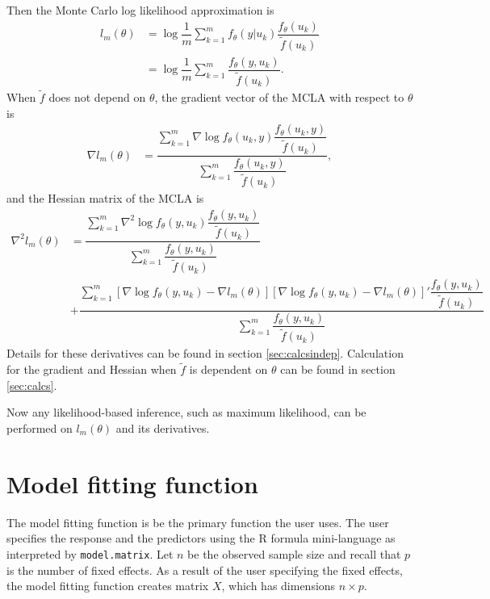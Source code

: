 \documentclass{article}
\begin{document}
Then the Monte Carlo log likelihood approximation is
\begin{align}
l_{m}(\theta) &=\log \dfrac{1}{m} \sum_{k=1}^mf_\theta(y|u_k)  \dfrac{ f_\theta(u_k)   }{\tilde{f}(u_k)}\\
&= \log \dfrac{1}{m} \sum_{k=1}^m  \dfrac{ f_\theta(y,u_k)   }{\tilde{f}(u_k)}. \label{eq:MCLAval}
\end{align}
When $\tilde{f}$ does not depend on $\theta$, the gradient vector of the MCLA with respect to $\theta$ is
\begin{align}
\nabla l_m(\theta)&= \dfrac{\sum_{k=1}^m     \nabla \log f_\theta(u_k,y)  \dfrac{f_\theta(u_k,y)}{\tilde{f}(u_k)} }{\sum_{k=1}^m  \dfrac{f_\theta(u_k,y)}{\tilde{f}(u_k)}  }, \label{eq:MCLAgradient}
\end{align}
and the Hessian matrix of the MCLA is
\begin{align}
\nabla^2 l_m(\theta)&= \dfrac{   \sum_{k=1}^m  \nabla^2 \log f_\theta(y,u_k)       \dfrac{ f_\theta(y,u_k)}{\tilde{f}(u_k)}  }{\sum_{k=1}^m  \dfrac{ f_\theta(y,u_k)   }{\tilde{f}(u_k)}} \nonumber\\
&+ \dfrac{   \sum_{k=1}^m \left[ \nabla \log f_\theta(y,u_k)   - \nabla l_m(\theta)   \right] \left[ \nabla \log f_\theta(y,u_k)  - \nabla l_m(\theta)  \right]'  \dfrac{ f_\theta(y,u_k)   }{\tilde{f}(u_k)}   }{\sum_{k=1}^m  \dfrac{ f_\theta(y,u_k)   }{\tilde{f}(u_k)}} \label{eq:MCLAhessian}
\end{align}
Details for these derivatives can be found in section \ref{sec:calcsindep}. Calculation for the gradient and Hessian when $\tilde{f}$ is dependent on $\theta$ can be found in section \ref{sec:calcs}.



Now any likelihood-based inference, such as maximum likelihood, can be performed on $l_m(\theta)$ and its derivatives.  









\section{Model fitting function} 
The model fitting function is be the primary function the user  uses. The user  specifies the response and the predictors using the R formula mini-language as interpreted by \texttt{model.matrix}. Let $n$ be the observed sample size and recall that $p$ is the number of fixed effects.  As a result of the user specifying the fixed effects, the model fitting function creates matrix $X$, which has dimensions $n \times p$. 
\end{document}

